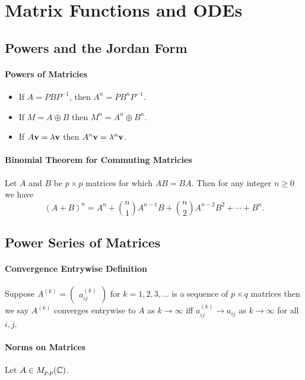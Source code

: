 \section{Matrix Functions and ODEs}

\subsection{Powers and the Jordan Form}

\paragraph{Powers of Matricies}
\begin{itemize}
    \item If \(A = PBP^{-1}\), then \(A^n = PB^nP^{-1}\).
    \item If \(M = A \oplus B\) then \(M^n = A^n \oplus B^n\).
    \item If \(A\mathbf{v} = \lambda\mathbf{v}\) then \(A^n\mathbf{v} = \lambda^n\mathbf{v}\).
\end{itemize}

\paragraph{Binomial Theorem for Commuting Matricies}
Let \(A\) and \(B\) be \(p \times p\) matrices for which \(AB = BA\). Then for any integer \(n \geq 0\) we have
\[(A + B)^n = A^n + \binom{n}{1}A^{n-1}B + \binom{n}{2}A^{n-2}B^2 + \cdots + B^n.\] 

\subsection{Power Series of Matrices}
\paragraph{Convergence Entrywise Definition}
Suppose \(A^(k) = \begin{pmatrix} a_{ij}^{(k)} \end{pmatrix}\) for \(k = 1,2,3,\dots\) is a sequence of \(p \times q\) matrices then we say \(A^(k)\) converges entrywise to \(A\) as \(k \to \infty\) iff \(a_{ij}^{(k)} \to a_{ij}\) as \(k \to \infty\) for all \(i,j\).

\paragraph{Norms on Matrices}
Let \(A \in M_{p,p}(\mathbb{C})\).

